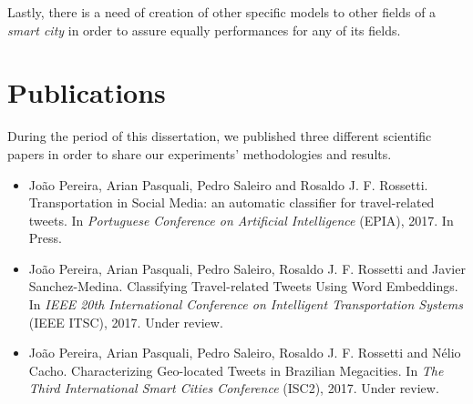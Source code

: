 Lastly, there is a need of creation of other specific models to other fields of a \textit{smart city} in order to assure equally performances for any of its fields.


\section{Publications}
\label{sec:publications}
During the period of this dissertation, we published three different scientific papers in order to share our experiments' methodologies and results.

\begin{itemize}
	\item
	João Pereira, Arian Pasquali, Pedro Saleiro and Rosaldo J. F. Rossetti. {\color{blue}Transportation in Social Media: an automatic classifier for travel-related tweets}. In \emph{Portuguese Conference on Artificial Intelligence} (EPIA), 2017. In Press.
	
	\item
	João Pereira, Arian Pasquali, Pedro Saleiro, Rosaldo J. F. Rossetti and Javier Sanchez-Medina. {\color{blue}Classifying Travel-related Tweets Using Word Embeddings}. In \emph{IEEE 20th International Conference on Intelligent Transportation Systems} (IEEE ITSC), 2017. Under review.
	
	\item
	João Pereira, Arian Pasquali, Pedro Saleiro, Rosaldo J. F. Rossetti and Nélio Cacho. {\color{blue}Characterizing Geo-located Tweets in Brazilian Megacities}. In \emph{The Third International Smart Cities Conference} (ISC2), 2017. Under review.
\end{itemize}
